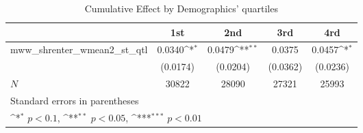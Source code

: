 \begin{table}[htbp]\centering
\def\sym#1{\ifmmode^{#1}\else\(^{#1}\)\fi}
\caption{Cumulative Effect by Demographics' quartiles}
\begin{tabular}{l*{4}{c}}
\hline\hline
            &\multicolumn{1}{c}{1st}&\multicolumn{1}{c}{2nd}&\multicolumn{1}{c}{3rd}&\multicolumn{1}{c}{4rd}\\
\hline
mww\_shrenter\_wmean2\_st\_qtl&      0.0340\sym{*}  &      0.0479\sym{**} &      0.0375         &      0.0457\sym{*}  \\
            &    (0.0174)         &    (0.0204)         &    (0.0362)         &    (0.0236)         \\
\hline
\(N\)       &       30822         &       28090         &       27321         &       25993         \\
\hline\hline
\multicolumn{5}{l}{\footnotesize Standard errors in parentheses}\\
\multicolumn{5}{l}{\footnotesize \sym{*} \(p<0.1\), \sym{**} \(p<0.05\), \sym{***} \(p<0.01\)}\\
\end{tabular}
\end{table}
